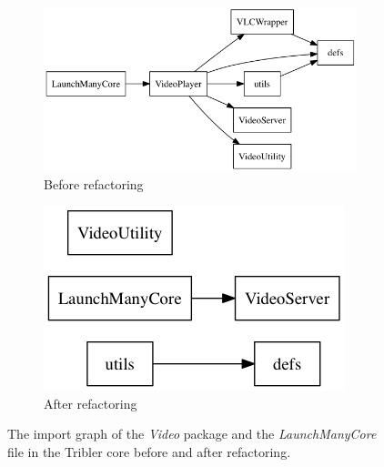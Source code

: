 \begin{figure}
	\centering
	\begin{subfigure}{.5\textwidth}
		\centering
		\includegraphics[width=.9\linewidth]{images/implementation/output_video_nov15}
		\caption{Before refactoring}
		\label{fig:video-package-refactoring-before}
	\end{subfigure}%
	\begin{subfigure}{.5\textwidth}
		\centering
		\includegraphics[width=.7\linewidth]{images/implementation/output_video_july16}
		\caption{After refactoring}
		\label{fig:video-package-refactoring-after}
	\end{subfigure}
	\caption{The import graph of the \emph{Video} package and the \emph{LaunchManyCore} file in the Tribler core before and after refactoring.}
	\label{fig:video-package-refactoring}
\end{figure}

